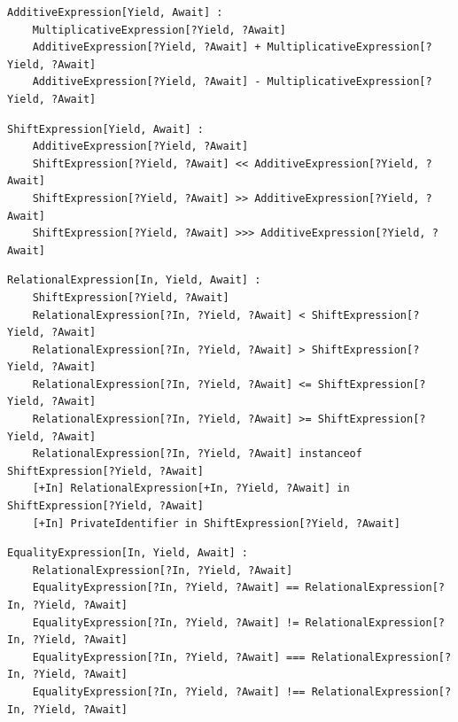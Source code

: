 \noindent\textbf{\texttt{}}\par
\begin{lstlisting}
AdditiveExpression[Yield, Await] :
    MultiplicativeExpression[?Yield, ?Await]
    AdditiveExpression[?Yield, ?Await] + MultiplicativeExpression[?Yield, ?Await]
    AdditiveExpression[?Yield, ?Await] - MultiplicativeExpression[?Yield, ?Await]
\end{lstlisting}

\noindent\textbf{\texttt{}}\par
\begin{lstlisting}
ShiftExpression[Yield, Await] :
    AdditiveExpression[?Yield, ?Await]
    ShiftExpression[?Yield, ?Await] << AdditiveExpression[?Yield, ?Await]
    ShiftExpression[?Yield, ?Await] >> AdditiveExpression[?Yield, ?Await]
    ShiftExpression[?Yield, ?Await] >>> AdditiveExpression[?Yield, ?Await]
\end{lstlisting}

\noindent\textbf{\texttt{}}\par
\begin{lstlisting}
RelationalExpression[In, Yield, Await] :
    ShiftExpression[?Yield, ?Await]
    RelationalExpression[?In, ?Yield, ?Await] < ShiftExpression[?Yield, ?Await]
    RelationalExpression[?In, ?Yield, ?Await] > ShiftExpression[?Yield, ?Await]
    RelationalExpression[?In, ?Yield, ?Await] <= ShiftExpression[?Yield, ?Await]
    RelationalExpression[?In, ?Yield, ?Await] >= ShiftExpression[?Yield, ?Await]
    RelationalExpression[?In, ?Yield, ?Await] instanceof ShiftExpression[?Yield, ?Await]
    [+In] RelationalExpression[+In, ?Yield, ?Await] in ShiftExpression[?Yield, ?Await]
    [+In] PrivateIdentifier in ShiftExpression[?Yield, ?Await]
\end{lstlisting}

\noindent\textbf{\texttt{}}\par
\begin{lstlisting}
EqualityExpression[In, Yield, Await] :
    RelationalExpression[?In, ?Yield, ?Await]
    EqualityExpression[?In, ?Yield, ?Await] == RelationalExpression[?In, ?Yield, ?Await]
    EqualityExpression[?In, ?Yield, ?Await] != RelationalExpression[?In, ?Yield, ?Await]
    EqualityExpression[?In, ?Yield, ?Await] === RelationalExpression[?In, ?Yield, ?Await]
    EqualityExpression[?In, ?Yield, ?Await] !== RelationalExpression[?In, ?Yield, ?Await]
\end{lstlisting}

